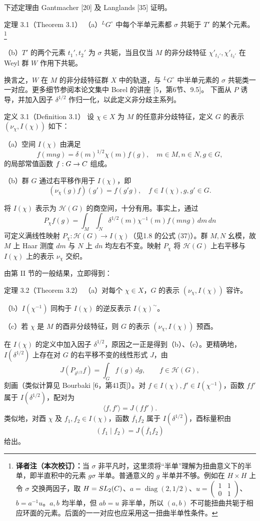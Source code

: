 下述定理由 Gantmacher [20] 及 Langlands [35] 证明。
\begin{originaltheorem}{定理 3.1（Theorem 3.1）}
（a）$^LG^\circ$ 中每个半单元素都 $\sigma$ 共轭于 $T'$ 的某个元素。\footnote{\textbf{译者注（本次校订）：}当 $\sigma$ 非平凡时，这里须将“半单”理解为扭曲意义下的半单，即半直积中的元素 $g\sigma$ 半单。普通意义的 $g$ 半单并不够。例如在 $H\times H$ 上令 $\sigma$ 交换两因子，取 $H=SL_2(C)$、$a=\operatorname{diag}(2,1/2)$、$u=\left(\begin{smallmatrix}1&1\\0&1\end{smallmatrix}\right)$、$b=a^{-1}u$。$a,b$ 均半单，但 $ab=u$ 非半单，所以 $(a,b)$ 不可能扭曲共轭于相应环面的元素。后面的一一对应也应采用这一扭曲半单性条件。}

（b）$T'$ 的两个元素 $t_1',t_2'$ 为 $\sigma$ 共轭，当且仅当 $M$ 的非分歧特征 $\chi'_{t_1'},\chi'_{t_2'}$ 在 Weyl 群 $W$ 作用下共轭。
\end{originaltheorem}
换言之，$W$ 在 $M$ 的非分歧特征群 $X$ 中的轨道，与 $^LG^\circ$ 中半单元素的 $\sigma$ 共轭类一一对应。更多细节参阅本论文集中 Borel 的讲座 [5，第6节、9.5]。
下面从 $P$ 诱导，并加入因子 $\delta^{1/2}$ 作归一化，以此定义非分歧主系列。
\begin{originaltheorem}{定义 3.1（Definition 3.1）}
设 $\chi\in X$ 为 $M$ 的任意非分歧特征，定义 $G$ 的表示 $(\nu_\chi,I(\chi))$ 如下：

（a）空间 $I(\chi)$ 由满足
\[
f(mng)=\delta(m)^{1/2}\chi(m)f(g),\quad m\in M,n\in N,g\in G,\tag{6}
\]
的局部常值函数 $f:G\to C$ 组成。

（b）群 $G$ 通过右平移作用于 $I(\chi)$，即
\[
(\nu_\chi(g)f)(g')=f(g'g),\quad f\in I(\chi),g,g'\in G.\tag{7}
\]
\end{originaltheorem}
将 $I(\chi)$ 表示为 $\mathcal H(G)$ 的商空间，十分有用。事实上，通过
\[
P_\chi f(g)=\int_M\int_N\delta^{1/2}(m)\chi^{-1}(m)f(mng)\,dm\,dn\tag{8}
\]
可定义满线性映射 $P_\chi:\mathcal H(G)\to I(\chi)$（见1.8 的公式 (37)）。群 $M,N$ 幺模，故 $M$ 上 Haar 测度 $dm$ 与 $N$ 上 $dn$ 均左右不变。映射 $P_\chi$ 将 $\mathcal H(G)$ 上右平移与 $I(\chi)$ 上的表示 $\nu_\chi$ 交织。

由第 II 节的一般结果，立即得到：
\begin{originaltheorem}{定理 3.2（Theorem 3.2）}
（a）对每个 $\chi\in X$，$G$ 的表示 $(\nu_\chi,I(\chi))$ 容许。

（b）$I(\chi^{-1})$ 同构于 $I(\chi)$ 的逆反表示 $I(\chi)^\sim$。

（c）若 $\chi$ 是 $M$ 的酉非分歧特征，则 $G$ 的表示 $(\nu_\chi,I(\chi))$ 预酉。
\end{originaltheorem}
在 $I(\chi)$ 的定义中加入因子 $\delta^{1/2}$，原因之一正是得到（b）、（c）。更精确地，$I(\delta^{1/2})$ 上存在对 $G$ 的右平移不变的线性形式 $J$，由
\[
J(P_{\delta^{1/2}}f)=\int_G f(g)\,dg,\qquad f\in\mathcal H(G),\tag{9}
\]
刻画（类似计算见 Bourbaki [6，第41页]）。对 $f\in I(\chi),f'\in I(\chi^{-1})$，函数 $ff'$ 属于 $I(\delta^{1/2})$，配对为
\[
\langle f,f'\rangle=J(ff').\tag{10}
\]
类似地，对酉 $\chi$ 及 $f_1,f_2\in I(\chi)$，函数 $\overline{f_1}f_2$ 属于 $I(\delta^{1/2})$，酉标量积由
\[
(f_1\mid f_2)=J(\overline{f_1}f_2)\tag{11}
\]
给出。

